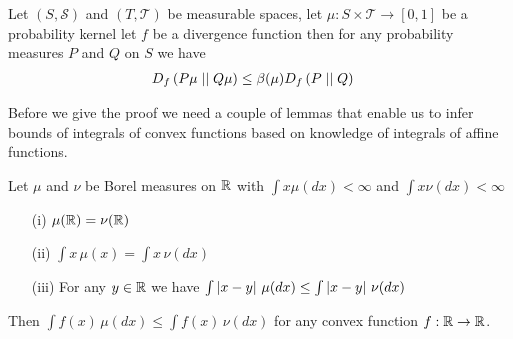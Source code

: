 \begin{thm}Let $(S, \mathcal{S})$ and $(T, \mathcal{T})$ be measurable spaces, let $\mu : S
\times \mathcal{T} \to [0,1]$ be a probability kernel let $f$ be a divergence function then for any probability measures $P$ and $Q$ on $S$ we have
\begin{align*}
\fdiv{P \mu}{Q \mu}{f} &\leq \beta(\mu) \fdiv{P}{Q}{f}
\end{align*}
\end{thm}

Before we give the proof we need a couple of lemmas that enable us to infer bounds of integrals of convex functions based on knowledge of integrals of affine functions.

\begin{lem}\label{BoundConvexViaAffine}Let $\mu$ and $\nu$ be Borel measures on $\reals$ with $\int x \mu(dx) < \infty$ and $\int x \nu(dx) < \infty$
\begin{itemize}
\item[(i)] $\mu(\reals) = \nu(\reals)$ 
\item[(ii)] $\int x \, \mu(x) = \int x \, \nu(dx)$
\item[(iii)] For any $y \in \reals$ we have $\int \abs{x - y} \, \mu(dx) \leq \int \abs{x - y} \, \nu(dx)$ 
\end{itemize}
Then $\int f(x) \, \mu(dx) \leq \int f(x) \, \nu(dx)$ for any convex function $f : \reals \to \reals$.  
\end{lem}
